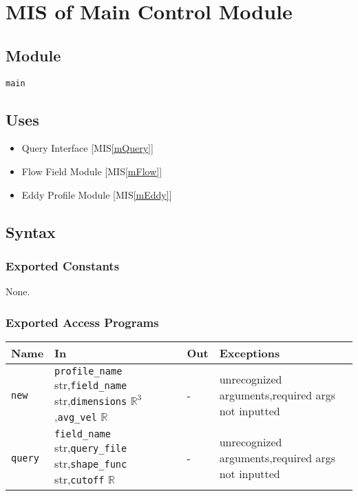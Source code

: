 \documentclass[12pt, titlepage]{article}
\begin{document}
\newpage
\section{MIS of Main Control Module} \label{mMain} 

\subsection{Module}
\texttt{main}

\subsection{Uses}
\begin{itemize}
\item Query Interface [MIS\ref{mQuery}]
\item Flow Field Module [MIS\ref{mFlow}]
\item Eddy Profile Module [MIS\ref{mEddy}]
\end{itemize}

\subsection{Syntax}

\subsubsection{Exported Constants}
None.

\subsubsection{Exported Access Programs}

\begin{center}
\begin{tabular}{p{2cm} p{3.5cm} p{3cm} p{5cm}}
\hline
\textbf{Name} & \textbf{In} & \textbf{Out} & \textbf{Exceptions} \\
\hline
\texttt{new}  & \texttt{profile\_name} str,\newline\texttt{field\_name} str,\newline\texttt{dimensions} $\mathbb{R}^3$,\newline\texttt{avg\_vel} $\mathbb{R}$ & - & unrecognized arguments,\newline required args not inputted\\
\texttt{query}  & \texttt{field\_name} str,\newline\texttt{query\_file} str,\newline\texttt{shape\_func} str,\newline\texttt{cutoff} $\mathbb{R}$ & - & unrecognized arguments,\newline required args not inputted\\
\hline
\end{tabular}
\end{center}
\end{document}
